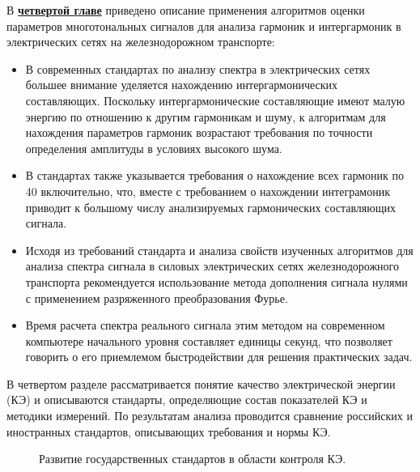 
В \underline{\textbf{четвертой главе}} приведено описание применения алгоритмов оценки параметров многотональных сигналов для анализа гармоник и интергармоник в электрических сетях на железнодорожном транспорте:

\begin{itemize}

\item В современных стандартах по анализу спектра в электрических сетях большее внимание уделяется нахождению интергармонических составляющих. Поскольку интергармонические составляющие имеют малую энергию по отношению к другим гармоникам и шуму, к алгоритмам для нахождения параметров гармоник возрастают требования по точности определения амплитуды в условиях высокого шума.

\item В стандартах также указывается требования о нахождение всех гармоник по 40 включительно, что, вместе с требованием о нахождении интеграмоник приводит к большому числу анализируемых гармонических составляющих сигнала.

\item Исходя из требований стандарта и анализа свойств изученных алгоритмов для анализа спектра сигнала в силовых электрических сетях железнодорожного транспорта рекомендуется использование метода дополнения сигнала нулями с применением разряженного преобразования Фурье.

\item Время расчета спектра реального сигнала этим методом на современном компьютере начального уровня составляет единицы секунд, что позволяет говорить о его приемлемом быстродействии для решения практических задач.
\end{itemize}

В четвертом разделе рассматривается понятие качество электрической энергии (КЭ) и описываются стандарты, определяющие состав показателей КЭ и методики измерений. По результатам анализа проводится сравнение российских и иностранных стандартов, описывающих требования и нормы КЭ.

\begin{figure}[ht]
	\caption{Развитие государственных стандартов в области контроля КЭ.}\label{img:picture1}
\end{figure} 

